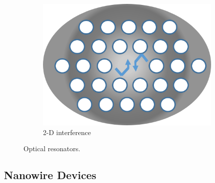\begin{figure}
\begin{subfigure}[b]{0.3\textwidth}
	\end{subfigure}%
	\hspace*{0.5cm}
	\begin{subfigure}[b]{0.3\textwidth}
		\centering
		\includegraphics[width=.85\linewidth]{Figs/Ch1/pcc}
		\caption{2-D interference}
	\end{subfigure}%
	
	\caption{Optical resonators.}
	\label{1.13}
\end{figure}

\FloatBarrier

\subsection{Nanowire Devices}

